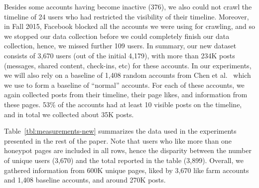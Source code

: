 \documentclass[twocolumn,10pt,letterpaper]{article}
\begin{document}
Besides some accounts having become inactive (376), we also could not crawl the timeline of 24 users who had restricted the visibility of their timeline. Moreover, in Fall 2015, Facebook blocked all the accounts we were using for crawling, and so we stopped our data collection before we could completely finish our data collection, hence, we missed further 109 users. In summary, our new dataset consists of 3,670 users (out of the initial 4,179), with more than 234K posts (messages, shared content, check-ins, etc) for these accounts. %
%
In our experiments, we will also rely on a baseline of 1,408 random accounts from Chen et al.~\cite{chen2013much} %
which we use to form a baseline of ``normal'' accounts. For each of these accounts, we again collected posts from their timeline, their page likes, and information from these pages. 53\% of the accounts had at least 10 visible posts on the timeline, and in total we collected about 35K posts.

\begin{table}[t]
%
\centering
%
\tabcolsep=0.11cm
\vspace{-0.15cm}
\caption{Overview of the datasets used in our study.}
\label{tbl:measurements-new}
%
\end{table}


Table~\ref{tbl:measurements-new} summarizes the data used in the experiments presented in the rest of the paper. Note that users who like more than one honeypot pages are included in all rows, hence the disparity between the number of unique users (3,670) and the total reported in the table (3,899). Overall, we gathered information from 600K unique pages, liked by 3,670 like farm accounts and 1,408 baseline accounts, and around 270K  posts.
\end{document}

